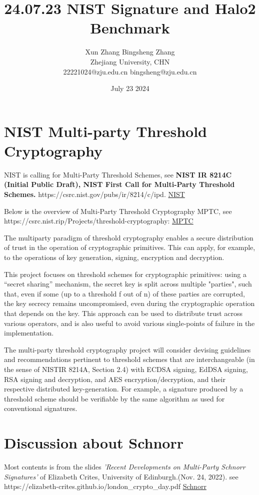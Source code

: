 \documentclass{article}
\title{24.07.23 NIST Signature and Halo2 Benchmark}
\author{Xun Zhang \quad \quad Bingsheng Zhang \\ 
Zhejiang University, CHN \\
22221024@zju.edu.cn \quad bingsheng@zju.edu.cn}
\date{July 23 2024}
\begin{document}
\maketitle
\section{NIST Multi-party Threshold Cryptography}

NIST is calling for Multi-Party Threshold Schemes, see \textbf{NIST IR 8214C (Initial Public Draft), NIST First Call for Multi-Party Threshold Schemes.} https://csrc.nist.gov/pubs/ir/8214/c/ipd.
\href{https://csrc.nist.gov/pubs/ir/8214/c/ipd}{NIST}

Below is the overview of Multi-Party Threshold Cryptography MPTC,
see https://csrc.nist.rip/Projects/threshold-cryptography:
\href{https://csrc.nist.rip/Projects/threshold-cryptography}{MPTC}


The multiparty paradigm of threshold cryptography enables a secure distribution of trust in the operation of cryptographic primitives. This can apply, for example, to the operations of key generation, signing, encryption and decryption.

This project focuses on threshold schemes for cryptographic primitives: using a “secret sharing” mechanism, the secret key is split across multiple "parties", such that, even if some (up to a threshold f out of n) of these parties are corrupted, the key secrecy remains uncompromised, even during the cryptographic operation that depends on the key. This approach can be used to distribute trust across various operators, and is also useful to avoid various single-points of failure in the implementation.

The multi-party threshold cryptography project will consider devising guidelines and recommendations pertinent to threshold schemes that are interchangeable (in the sense of NISTIR 8214A, Section 2.4) with ECDSA signing, EdDSA signing, RSA signing and decryption, and AES encryption/decryption, and their respective distributed key-generation. For example, a signature produced by a threshold scheme should be verifiable by the same algorithm as used for conventional signatures.


\section{Discussion about Schnorr}

Most contents is from the slides \textit{'Recent Developments on Multi-Party Schnorr Signatures'} of Elizabeth Crites, University of Edinburgh.(Nov. 24, 2022).
see https://elizabeth-crites.github.io/london\_crypto\_day.pdf
\href{https://elizabeth-crites.github.io/london_crypto_day.pdf}{Schnorr}
\end{document}
